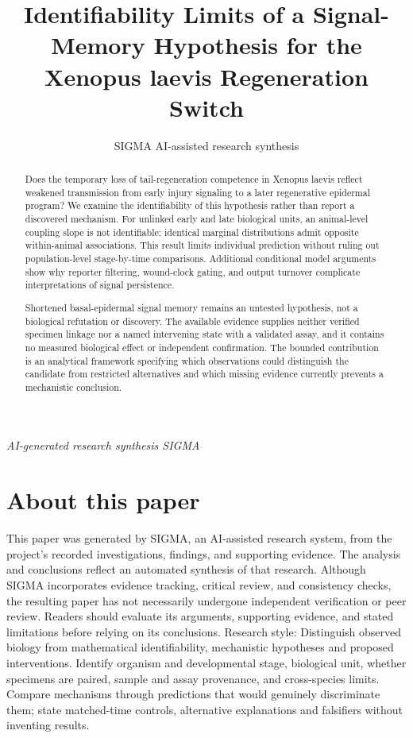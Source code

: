 \documentclass[11pt]{article}
\title{Identifiability Limits of a Signal-Memory Hypothesis for the Xenopus laevis Regeneration Switch}
\date{}
\author{SIGMA AI-assisted research synthesis}
\begin{document}
\maketitle
\begin{center}\end{center}
\begin{center}\small\textit{AI-generated research synthesis \textperiodcentered{} SIGMA}\end{center}

\begin{abstract}
Does the temporary loss of tail-regeneration competence in Xenopus laevis reflect weakened transmission from early injury signaling to a later regenerative epidermal program? We examine the identifiability of this hypothesis rather than report a discovered mechanism. For unlinked early and late biological units, an animal-level coupling slope is not identifiable: identical marginal distributions admit opposite within-animal associations. This result limits individual prediction without ruling out population-level stage-by-time comparisons. Additional conditional model arguments show why reporter filtering, wound-clock gating, and output turnover complicate interpretations of signal persistence.

Shortened basal-epidermal signal memory remains an untested hypothesis, not a biological refutation or discovery. The available evidence supplies neither verified specimen linkage nor a named intervening state with a validated assay, and it contains no measured biological effect or independent confirmation. The bounded contribution is an analytical framework specifying which observations could distinguish the candidate from restricted alternatives and which missing evidence currently prevents a mechanistic conclusion.
\end{abstract}
\section*{About this paper}
This paper was generated by SIGMA, an AI-assisted research system, from the project's recorded investigations, findings, and supporting evidence.
The analysis and conclusions reflect an automated synthesis of that research. Although SIGMA incorporates evidence tracking, critical review, and consistency checks, the resulting paper has not necessarily undergone independent verification or peer review.
Readers should evaluate its arguments, supporting evidence, and stated limitations before relying on its conclusions.
Research style: Distinguish observed biology from mathematical identifiability, mechanistic hypotheses and proposed interventions. Identify organism and developmental stage, biological unit, whether specimens are paired, sample and assay provenance, and cross-species limits. Compare mechanisms through predictions that would genuinely discriminate them; state matched-time controls, alternative explanations and falsifiers without inventing results.
\end{document}
